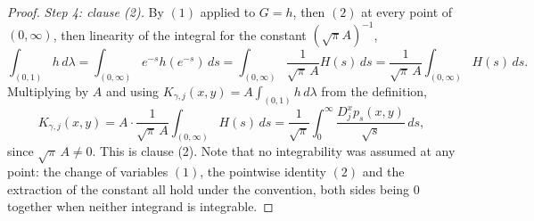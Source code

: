 \begin{proof}
\emph{Step 4: clause (2).}
By $(1)$ applied to $G = h$, then $(2)$ at every point of $(0,\infty)$, then
linearity of the integral for the constant $(\sqrt\pi A)^{-1}$,
\[
  \int_{(0,1)} h\,d\lambda
    = \int_{(0,\infty)} e^{-s}h(e^{-s})\,ds
    = \int_{(0,\infty)} \frac{1}{\sqrt\pi\,A}H(s)\,ds
    = \frac{1}{\sqrt\pi\,A}\int_{(0,\infty)} H(s)\,ds .
\]
Multiplying by $A$ and using $K_{\gamma,j}(x,y) = A\int_{(0,1)}h\,d\lambda$ from
the definition,
\[
  K_{\gamma,j}(x,y)
    = A\cdot\frac{1}{\sqrt\pi\,A}\int_{(0,\infty)} H(s)\,ds
    = \frac{1}{\sqrt\pi}\int_0^\infty \frac{D_j^xp_s(x,y)}{\sqrt s}\,ds ,
\]
since $\sqrt\pi\,A \neq 0$.  This is clause (2).  Note that no integrability was
assumed at any point: the change of variables $(1)$, the pointwise identity
$(2)$ and the extraction of the constant all hold under the convention, both
sides being $0$ together when neither integrand is integrable.
\end{proof}
